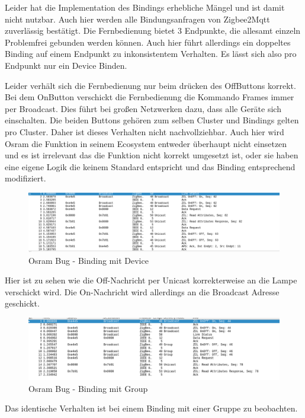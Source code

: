Leider hat die Implementation des Bindings erhebliche Mängel und ist damit nicht nutzbar. Auch hier werden alle Bindungsanfragen von Zigbee2Mqtt zuverlässig 
bestätigt. Die Fernbedienung bietet 3 Endpunkte, die allesamt einzeln Problemfrei gebunden werden können. Auch hier führt allerdings ein doppeltes Binding auf einem 
Endpunkt zu inkonsistentem Verhalten. Es lässt sich also pro Endpunkt nur ein Device Binden.

Leider verhält sich die Fernbedienung nur beim drücken des \grqq Off\grqq Buttons korrekt. Bei dem \grqq On\grqq Button verschickt die Fernbedienung die Kommando Frames immer 
per Broadcast. Dies führt bei großen Netzwerken dazu, dass alle Geräte sich einschalten. Die beiden Buttons gehören zum selben Cluster und Bindings gelten pro Cluster. Daher ist 
dieses Verhalten nicht nachvollziehbar. Auch hier wird Osram die Funktion in seinem Ecosystem entweder überhaupt nicht einsetzen und es ist irrelevant das die Funktion nicht korrekt 
umgesetzt ist, oder sie haben eine eigene Logik die keinem Standard entspricht und das Binding entsprechend modifiziert.

\begin{figure}[H]
  \centering
  \includegraphics[width=1\textwidth]{media/osram-device.png}
  \caption{Osram Bug - Binding mit Device}
\end{figure}
Hier ist zu sehen wie die Off-Nachricht per Unicast korrekterweise an die Lampe verschickt wird. Die On-Nachricht wird allerdings an die Broadcast Adresse geschickt.

\begin{figure}[H]
  \centering
  \includegraphics[width=1\textwidth]{media/osram-group.png}
  \caption{Osram Bug - Binding mit Group}
\end{figure}
Das identische Verhalten ist bei einem Binding mit einer Gruppe zu beobachten.


